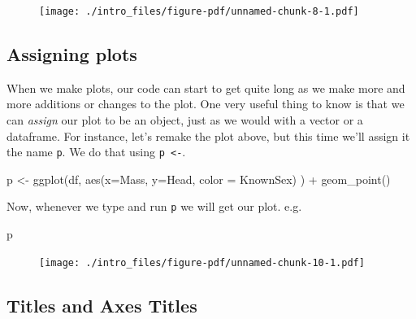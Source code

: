 \documentclass[
  letterpaper,
  DIV=11,
  numbers=noendperiod]{scrreprt}
\newenvironment{Shaded}{\begin{snugshade}}{\end{snugshade}}
\newcommand{\AttributeTok}[1]{\textcolor[rgb]{0.40,0.45,0.13}{#1}}
\newcommand{\FunctionTok}[1]{\textcolor[rgb]{0.28,0.35,0.67}{#1}}
\newcommand{\NormalTok}[1]{\textcolor[rgb]{0.00,0.23,0.31}{#1}}
\newcommand{\OtherTok}[1]{\textcolor[rgb]{0.00,0.23,0.31}{#1}}
\newcommand{\SpecialCharTok}[1]{\textcolor[rgb]{0.37,0.37,0.37}{#1}}
\begin{document}
\begin{figure}[H]

{\centering \texttt{[image: ./intro\_files/figure-pdf/unnamed-chunk-8-1.pdf]}

}

\end{figure}

\hypertarget{assigning-plots}{%
\subsection{Assigning plots}\label{assigning-plots}}

When we make plots, our code can start to get quite long as we make more
and more additions or changes to the plot. One very useful thing to know
is that we can \emph{assign} our plot to be an object, just as we would
with a vector or a dataframe. For instance, let's remake the plot above,
but this time we'll assign it the name \texttt{p}. We do that using
\texttt{p\ \textless{}-}.

\begin{Shaded}
\begin{Highlighting}[]
\NormalTok{p }\OtherTok{\textless{}{-}} \FunctionTok{ggplot}\NormalTok{(df, }\FunctionTok{aes}\NormalTok{(}\AttributeTok{x=}\NormalTok{Mass, }\AttributeTok{y=}\NormalTok{Head, }\AttributeTok{color =}\NormalTok{ KnownSex) ) }\SpecialCharTok{+} \FunctionTok{geom\_point}\NormalTok{() }
\end{Highlighting}
\end{Shaded}

Now, whenever we type and run \texttt{p} we will get our plot. e.g.

\begin{Shaded}
\begin{Highlighting}[]
\NormalTok{p}
\end{Highlighting}
\end{Shaded}

\begin{figure}[H]

{\centering \texttt{[image: ./intro\_files/figure-pdf/unnamed-chunk-10-1.pdf]}

}

\end{figure}

\hypertarget{titles-and-axes-titles}{%
\subsection{Titles and Axes Titles}\label{titles-and-axes-titles}}
\end{document}
